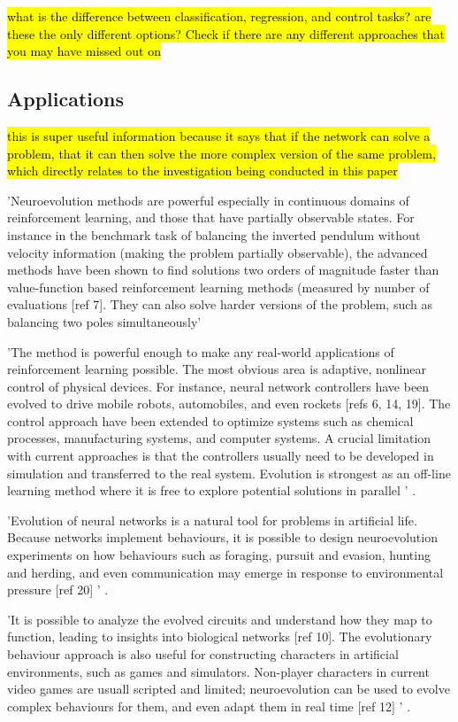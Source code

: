 \hl{what is the difference between classification, regression, and control tasks? are these the only different options? Check if there are any different approaches that you may have missed out on}


\subsection{Applications}

\hl{this is super useful information because it says that if the network can solve a problem, that it can then solve the more complex version of the same problem, which directly relates to the investigation being conducted in this paper}

'Neuroevolution methods are powerful especially in continuous domains of reinforcement learning, and those that have partially observable states. For instance in the benchmark task of balancing the inverted pendulum without velocity information (making the problem partially observable), the advanced methods have been shown to find solutions two orders of magnitude faster than value-function based reinforcement learning methods (measured by number of evaluations [ref 7]. They can also solve harder versions of the problem, such as balancing two poles simultaneously'

'The method is powerful enough to make any real-world applications of reinforcement learning possible. The most obvious area is adaptive, nonlinear control of physical devices. For instance, neural network controllers have been evolved to drive mobile robots, automobiles, and even rockets [refs 6, 14, 19]. The control approach have been extended to optimize systems such as chemical processes, manufacturing systems, and computer systems. A crucial limitation with current approaches is that the controllers usually need to be developed in simulation and transferred to the real system. Evolution is strongest as an off-line learning method where it is free to explore potential solutions in parallel ' \cite{Miikkulainen2010}.

'Evolution of neural networks is a natural tool for problems in artificial life. Because networks implement behaviours, it is possible to design neuroevolution experiments on how behaviours such as foraging, pursuit and evasion, hunting and herding, and even communication may emerge in response to environmental pressure [ref 20] ' \cite{Miikkulainen2010}.

'It is possible to analyze the evolved circuits and understand how they map to function, leading to insights into biological networks [ref 10]. The evolutionary behaviour approach is also useful for constructing characters in artificial environments, such as games and simulators. Non-player characters in current video games are usuall scripted and limited; neuroevolution can be used to evolve complex behaviours for them, and even adapt them in real time [ref 12] ' \cite{Miikkulainen2010}.


